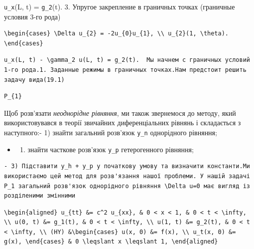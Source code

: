 \documentclass[
  ukrainian,
]{article}
\providecommand{\tightlist}{%
  \setlength{\itemsep}{0pt}\setlength{\parskip}{0pt}}
\begin{document}
\texttt{u\_x}(L, t) = \texttt{g\_2}(t). 3. Упругое закрепление в
граничных точках (граничные условия 3-го рода)

\begin{verbatim}
\begin{cases} \Delta u_{2} = -2u_{0}u_{1}, \\ u_{2}(1, \theta). \end{cases}
\end{verbatim}

\begin{verbatim}
u_x(L, t) - \gamma_2 u(L, t) = g_2(t).  Мы начнем с граничных условий 1-го рода.1. Заданные режимы в граничных точках.Нам предстоит решить задачу вида(19.1)
\end{verbatim}

\begin{verbatim}
P_{1}
\end{verbatim}

Щоб розв'язати \emph{неоднорідне рівняння}, ми також звернемося до
методу, який використовувався в теорії звичайних диференціальних рівнянь
і складається з наступного:- 1) знайти загальний розв'язок \texttt{y\_n}
однорідного рівняння;

\begin{itemize}
\tightlist
\item
  \begin{enumerate}
  \def\labelenumi{\arabic{enumi})}
  \setcounter{enumi}{1}
  \tightlist
  \item
    знайти часткове розв'язок \texttt{y\_p} гетерогенного рівняння;
  \end{enumerate}
\end{itemize}

\begin{verbatim}
- 3) Підставити y_h + y_p у початкову умову та визначити константи.Ми використаємо цей метод для розв'язання нашої проблеми. У нашій задачі P_1 загальний розв'язок однорідного рівняння \Delta u=0 має вигляд із розділеними змінними
\end{verbatim}

\begin{verbatim}
\begin{aligned} u_{tt} &= c^2 u_{xx}, & 0 < x < 1, & 0 < t < \infty, \\ u(0, t) &= g_1(t), & 0 < t < \infty, \\ u(1, t) &= g_2(t), & 0 < t < \infty, \\ (HY) &\begin{cases} u(x, 0) &= f(x), \\ u_t(x, 0) &= g(x), \end{cases} & 0 \leqslant x \leqslant 1, \end{aligned}
\end{verbatim}
\end{document}
